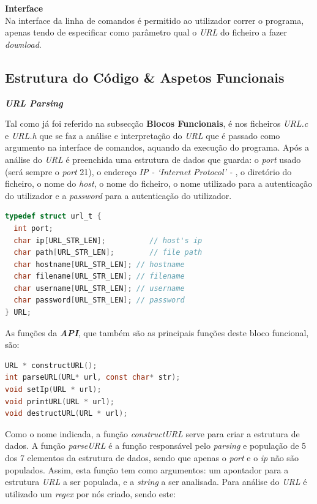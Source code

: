 \documentclass[a4paper, 11pt]{article}
\begin{document}
\large\textbf{Interface}\\
\normalsize
Na interface da linha de comandos é permitido ao utilizador correr o programa, apenas tendo de especificar como parâmetro qual o \textit{URL} do ficheiro a fazer \textit{download}.

\subsection{Estrutura do Código \& Aspetos Funcionais}

\large\textbf{\textit{URL Parsing}}\\
\normalsize

Tal como já foi referido na subsecção \textbf{Blocos Funcionais}, é nos ficheiros \textit{URL.c} e \textit{URL.h} que se faz a análise e interpretação do \textit{URL} que é passado como argumento na interface de comandos, aquando da execução do programa. Após a análise do \textit{URL} é preenchida uma estrutura de dados que guarda: o \textit{port} usado (será sempre o \textit{port} 21), o endereço \textit{IP - `Internet Protocol' - }, o diretório do ficheiro, o nome do \textit{host}, o nome do ficheiro, o nome utilizado para a autenticação do utilizador e a \textit{password} para a autenticação do utilizador.

\begin{lstlisting}[language=C]
typedef struct url_t {
  int port;
  char ip[URL_STR_LEN];          // host's ip
  char path[URL_STR_LEN];        // file path
  char hostname[URL_STR_LEN]; // hostname
  char filename[URL_STR_LEN]; // filename
  char username[URL_STR_LEN]; // username
  char password[URL_STR_LEN]; // password
} URL;
\end{lstlisting}

As  funções da \textit{\textbf{API}}, que também são as principais funções deste bloco funcional, são:

\begin{lstlisting}[language=C]
URL * constructURL();
int parseURL(URL* url, const char* str);
void setIp(URL * url);
void printURL(URL * url);
void destructURL(URL * url);
\end{lstlisting}

Como o nome indicada, a função \textit{constructURL} serve para criar a estrutura de dados.
A função \textit{parseURL} é a função responsável pelo \textit{parsing} e população de 5 dos 7 elementos da estrutura de dados, sendo que apenas o \textit{port} e o \textit{ip} não são populados. Assim, esta função tem como argumentos: um apontador para a estrutura \textit{URL} a ser populada, e a \textit{string} a ser analisada.
Para análise do \textit{URL} é utilizado um \textit{regex} por nós criado, sendo este:
\end{document}
